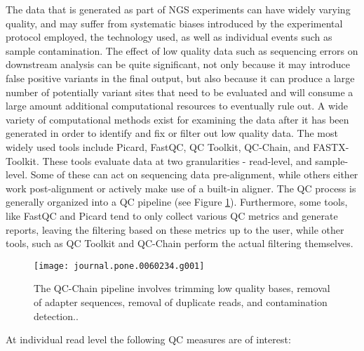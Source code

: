 The data that is generated as part of NGS experiments can have widely varying quality, and may suffer from systematic biases introduced by the experimental protocol employed, the technology used, as well as individual events such as sample contamination\autocites{lauss2013monitoring}{aird2011analyzing}{dohm2008substantial}{cibulskis2011contest}. The effect of low quality data such as sequencing errors on downstream analysis can be quite significant, not only because it may introduce false positive variants in the final output, but also because it can produce a large number of potentially variant sites that need to be evaluated and will consume a large amount additional computational resources to eventually rule out. A wide variety of computational methods exist for examining the data after it has been generated in order to identify and fix or filter out low quality data. The most widely used tools include Picard\autocite{Picard2018toolkit}, FastQC\autocite{andrews2010fastqc}, QC Toolkit\autocite{patel2012ngs}, QC-Chain\autocite{zhou2013qc}, and FASTX-Toolkit\autocite{gordon2010fastx}. These tools evaluate data at two granularities - read-level, and sample-level. Some of these can act on sequencing data pre-alignment, while others either work post-alignment or actively make use of a built-in aligner. The QC process is generally organized into a QC pipeline (see Figure \ref{fig:qc-chain}). Furthermore, some tools, like FastQC and Picard tend to only collect various QC metrics and generate reports, leaving the filtering based on these metrics up to the user, while other tools, such as QC Toolkit and QC-Chain perform the actual filtering themselves.

\begin{figure}[H]
    \texttt{[image: journal.pone.0060234.g001]}
    \centering
    \caption {The QC-Chain pipeline involves trimming low quality bases, removal of adapter sequences, removal of duplicate reads, and contamination detection.\autocite{zhou2013qc}.}
    \label{fig:qc-chain}
\end{figure}

At individual read level the following QC measures are of interest:


